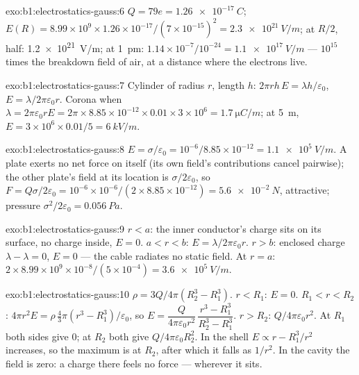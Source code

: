 \begin{solution}{exo:b1:electrostatics-gauss:6}
$Q = 79e = \qty{1.26e-17}{C}$; $E(R) = 8.99 \times 10^9 \times 1.26 \times 10^{-17}/
(7 \times 10^{-15})^2 = \qty{2.3e21}{V/m}$; at $R/2$, half: \qty{1.2e21}{V/m}; at
\qty{1}{pm}: $1.14 \times 10^{-7}/10^{-24} = \qty{1.1e17}{V/m}$ --- $10^{15}$ times
the breakdown field of air, at a distance where the electrons live.
\end{solution}

\begin{solution}{exo:b1:electrostatics-gauss:7}
Cylinder of radius $r$, length $h$: $2\pi rh\,E = \lambda h/\varepsilon_0$, $E =
\lambda/2\pi\varepsilon_0r$. Corona when $\lambda = 2\pi\varepsilon_0 rE = 2\pi \times 8.85 \times
10^{-12} \times 0.01 \times 3 \times 10^6 = \qty{1.7}{\micro C/m}$; at \qty{5}{m},
$E = 3 \times 10^6 \times 0.01/5 = \qty{6}{kV/m}$.
\end{solution}

\begin{solution}{exo:b1:electrostatics-gauss:8}
$E = \sigma/\varepsilon_0 = 10^{-6}/8.85 \times 10^{-12} = \qty{1.1e5}{V/m}$. A plate
exerts no net force on itself (its own field's contributions cancel
pairwise); the other plate's field at its location is $\sigma/2\varepsilon_0$, so
$F = Q\sigma/2\varepsilon_0 = 10^{-6} \times 10^{-6}/(2 \times 8.85 \times 10^{-12}) =
\qty{5.6e-2}{N}$, attractive; pressure $\sigma^2/2\varepsilon_0 = \qty{0.056}{Pa}$.
\end{solution}

\begin{solution}{exo:b1:electrostatics-gauss:9}
$r < a$: the inner conductor's charge sits on its surface, no charge
inside, $E = 0$. $a < r < b$: $E = \lambda/2\pi\varepsilon_0r$. $r > b$: enclosed
charge $\lambda - \lambda = 0$, $E = 0$ --- the cable radiates no static
field. At $r = a$: $2 \times 8.99 \times 10^9 \times 10^{-8}/(5 \times 10^{-4}) =
\qty{3.6e5}{V/m}$.
\end{solution}

\begin{solution}{exo:b1:electrostatics-gauss:10}
$\rho = 3Q/4\pi(R_2^3 - R_1^3)$. $r < R_1$: $E = 0$. $R_1 < r < R_2$: $4\pi r^2E =
\rho\,\tfrac43\pi(r^3 - R_1^3)/\varepsilon_0$, so $E = \dfrac{Q}{4\pi\varepsilon_0r^2}\,
\dfrac{r^3 - R_1^3}{R_2^3 - R_1^3}$. $r > R_2$: $Q/4\pi\varepsilon_0r^2$. At $R_1$ both
sides give $0$; at $R_2$ both give $Q/4\pi\varepsilon_0R_2^2$. In the shell $E
\propto r - R_1^3/r^2$ increases, so the maximum is at $R_2$, after
which it falls as $1/r^2$. In the cavity the field is zero: a charge
there feels no force --- wherever it sits.
\end{solution}

